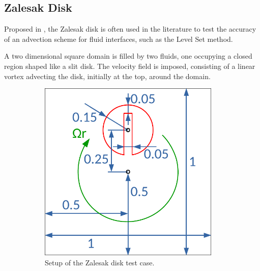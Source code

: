 \documentclass[11pt, a4paper, oneside, openany]{book}
\begin{document}
\subsection{Zalesak Disk}\label{Subsection_Zalesak_Disk}
Proposed in \cite{Zalesak1979}, the Zalesak disk is often used in the literature to test the accuracy of an advection scheme for fluid interfaces, such as the Level Set method.\par
A two dimensional square domain is filled by two fluids, one occupying a closed region shaped like a slit disk. The velocity field is imposed, consisting of a linear vortex advecting the disk, initially at the top, around the domain.\par
\begin{figure}[!ht]
	\centering
	\begin{subfigure}{.5\textwidth}
		\includegraphics[width=0.95\textwidth]{ZalesakSetup.pdf}
		\caption[Zalesak Setup]{Setup of the Zalesak disk test case.}\label{ZalesakSetup}
	\end{subfigure}%
	\begin{subfigure}{.5\textwidth}

\end{subfigure}
\end{figure}
\end{document}
